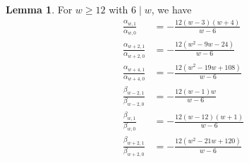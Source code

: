 \documentclass[10pt,reqno]{amsproc}
\newcommand{\1}{\mathds{1}}	%
\theoremstyle{definition}
\newtheorem{lemma}[theorem]{Lemma}
\theoremstyle{remark}
\begin{document}
\begin{lemma}
    \label{lem:n1coeff}
    For $w \ge 12$ with $6 \mid w$, we have
    \begin{align}
        \frac{\alpha_{w, 1}}{\alpha_{w, 0}} &= -\frac{12(w-3)(w+4)}{w-6} \\
        \frac{\alpha_{w+2,1}}{\alpha_{w+2,0}} &= - \frac{12(w^2 - 9w - 24)}{w-6} \\
        \frac{\alpha_{w+4,1}}{\alpha_{w+4,0}} &= - \frac{12(w^2 - 19w + 108)}{w-6} \\
        \frac{\beta_{w-2,1}}{\beta_{w-2,0}} &= -\frac{12(w-1)w}{w-6} \\
        \frac{\beta_{w,1}}{\beta_{w,0}} &= -\frac{12(w-12)(w+1)}{w-6} \\
        \frac{\beta_{w+2,1}}{\beta_{w+2,0}} &= - \frac{12(w^2 - 21w + 120)}{w-6} 
    \end{align}
\end{lemma}
\end{document}
